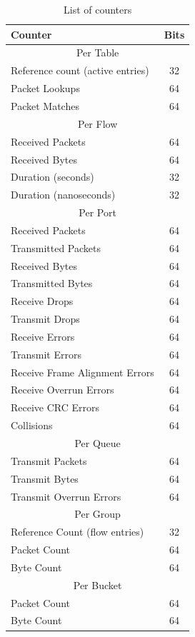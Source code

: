 \documentclass[10pt]{article}
\begin{document}
\begin{table}[!hbp]
\centering
\footnotesize
\begin{tabular}{ |l|c| }
\hline Counter & Bits	 \\
\hline \multicolumn{2}{|c|}{Per Table} \\
\hline Reference count (active entries) & 32 \\
\hline Packet Lookups & 64 \\
\hline Packet Matches & 64 \\
\hline \multicolumn{2}{|c|}{Per Flow} \\
\hline Received Packets & 64 \\
\hline Received Bytes & 64 \\
\hline Duration (seconds) & 32 \\
\hline Duration (nanoseconds) & 32 \\
\hline  \multicolumn{2}{|c|}{Per Port} \\
\hline Received Packets & 64 \\
\hline Transmitted Packets & 64 \\
\hline Received Bytes & 64 \\
\hline Transmitted Bytes & 64 \\
\hline Receive Drops & 64 \\
\hline Transmit Drops & 64 \\
\hline Receive Errors & 64 \\
\hline Transmit Errors & 64 \\
\hline Receive Frame Alignment Errors & 64 \\
\hline Receive Overrun Errors & 64 \\
\hline Receive CRC Errors & 64 \\
\hline Collisions & 64 \\
\hline  \multicolumn{2}{|c|}{Per Queue} \\
\hline Transmit Packets & 64 \\
\hline Transmit Bytes & 64 \\
\hline Transmit Overrun Errors & 64\\
\hline \multicolumn{2}{|c|}{Per Group} \\
\hline Reference Count (flow entries) & 32 \\
\hline Packet Count & 64 \\
\hline Byte Count & 64 \\
\hline \multicolumn{2}{|c|}{Per Bucket} \\
\hline Packet Count & 64 \\
\hline Byte Count & 64 \\
\hline
\end{tabular}
\caption{List of counters}
\label{table:counters}
\end{table}
\end{document}
